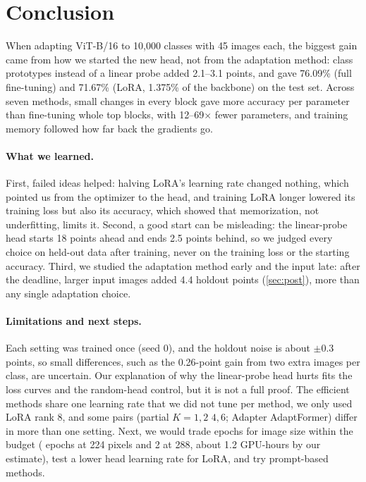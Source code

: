 \section{Conclusion}
\label{sec:conclusion}

When adapting ViT-B/16 to 10,000 classes with 45 images each, the biggest gain came from how we started the new head, not from the adaptation method: class prototypes instead of a linear probe added 2.1--3.1 points, and gave 76.09\% (full fine-tuning) and 71.67\% (LoRA, 1.375\% of the backbone) on the test set.
Across seven methods, small changes in every block gave more accuracy per parameter than fine-tuning whole top blocks, with 12--69$\times$ fewer parameters, and training memory followed how far back the gradients go.

\paragraph{What we learned.}
First, failed ideas helped: halving LoRA's learning rate changed nothing, which pointed us from the optimizer to the head, and training LoRA longer lowered its training loss but also its accuracy, which showed that memorization, not underfitting, limits it.
Second, a good start can be misleading: the linear-probe head starts 18 points ahead and ends 2.5 points behind, so we judged every choice on held-out data after training, never on the training loss or the starting accuracy.
Third, we studied the adaptation method early and the input late: after the deadline, larger input images added 4.4 holdout points (\cref{sec:post}), more than any single adaptation choice.

\paragraph{Limitations and next steps.}
Each setting was trained once (seed 0), and the holdout noise is about $\pm$0.3 points, so small differences, such as the 0.26-point gain from two extra images per class, are uncertain.
Our explanation of why the linear-probe head hurts fits the loss curves and the random-head control, but it is not a full proof.
The efficient methods share one learning rate that we did not tune per method, we only used LoRA rank 8, and some pairs (partial $K = 1, 2$ \vs $4, 6$; Adapter \vs AdaptFormer) differ in more than one setting.
Next, we would trade epochs for image size within the budget ( epochs at 224 pixels and 2 at 288, about 1.2 GPU-hours by our estimate), test a lower head learning rate for LoRA, and try prompt-based methods.

